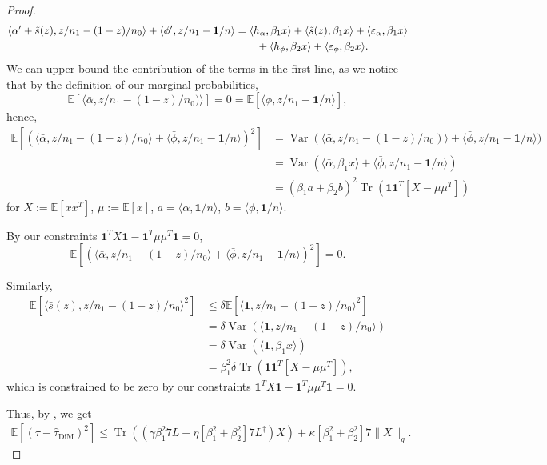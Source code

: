 \documentclass[12pt]{article}
\theoremstyle{definition}
\numberwithin{equation}{section}
\numberwithin{figure}{section}
\numberwithin{equation}{section}
\numberwithin{figure}{section}
\begin{document}
\begin{proof}
\begin{align*}
         \langle \alpha' + \Tilde{s}(z), z/n_1 - (1-z)/n_0 \rangle + \langle \phi',z/n_1 - \mathbf{1}/n\rangle &= \langle h_\alpha, \beta_1 x\rangle + \langle \Tilde{s}(z), \beta_1 x\rangle + \langle \varepsilon_\alpha, \beta_1 x\rangle\\
         &\quad\quad + \langle h_\phi, \beta_2 x\rangle + \langle \varepsilon_\phi, \beta_2 x\rangle.
     \end{align*}
     We can upper-bound the contribution of the terms in the first line, as we notice that by the definition of our marginal probabilities,
     \[\mathbb{E}[
      \langle \bar{\alpha}, z/n_1 - (1-z)/n_0)\rangle] = 0 = \mathbb{E}[\langle \bar{\phi},z/n_1 - \mathbf{1}/n\rangle],
     \]
     hence,
     \begin{align*}
         \mathbb{E}[(\langle \bar{\alpha}, z/n_1 - (1-z)/n_0 \rangle + \langle \bar{\phi},z/n_1 - \mathbf{1}/n\rangle)^2] &= \operatorname{Var}(\langle \bar{\alpha}, z/n_1 - (1-z)/n_0)\rangle + \langle \bar{\phi},z/n_1 - \mathbf{1}/n \rangle)\\
         &= \operatorname{Var}(\langle \bar{\alpha}, \beta_1 x\rangle + \langle \bar{\phi},z/n_1 - \mathbf{1}/n \rangle)\\
         &=(\beta_1 a + \beta_2 b)^2 \operatorname{Tr}(\mathbf{1}\mathbf{1}^T [X - \mu \mu^T])
     \end{align*}
     for $X:=\mathbb{E}[xx^T]$, $\mu := \mathbb{E}[x]$, $a = \langle \alpha, \mathbf{1}/n\rangle$, $b = \langle \phi, \mathbf{1}/n\rangle$. 

     By our constraints $\mathbf{1}^T X \mathbf{1} - \mathbf{1}^T \mu \mu^T \mathbf{1} = 0$, 
     \[\mathbb{E}[(\langle \bar{\alpha}, z/n_1 - (1-z)/n_0 \rangle + \langle \bar{\phi},z/n_1 - \mathbf{1}/n\rangle)^2] = 0.\]

     Similarly, 
     \begin{align*}
         \mathbb{E}[\langle \bar{s}(z), z/n_1 - (1-z)/n_0 \rangle^2] &\leq \delta \mathbb{E}[\langle \mathbf{1}, z/n_1 - (1-z)/n_0 \rangle^2] \\
         &= \delta \operatorname{Var}(\langle \mathbf{1}, z/n_1 - (1-z)/n_0\rangle) \\
         &= \delta \operatorname{Var}(\langle \mathbf{1}, \beta_1 x\rangle) \\
         &=\beta_1^2 \delta \operatorname{Tr}(\mathbf{1}\mathbf{1}^T [X - \mu \mu^T]),
     \end{align*} which is constrained to be zero by our constraints $\mathbf{1}^T X \mathbf{1} - \mathbf{1}^T \mu \mu^T \mathbf{1} = 0.$
     
     Thus, by , we get
     \begin{align*}
         \mathbb{E}[(\tau - \hat{\tau}_{\text{DiM}})^2] \leq \operatorname{Tr}((\gamma \beta_1^2 7 L + \eta[\beta_1^2 + \beta_2^2]7L^\dagger) X) + \kappa[\beta_1^2 + \beta_2^2]7 \|X\|_{q}.
     \end{align*}    
\end{proof}
\end{document}
